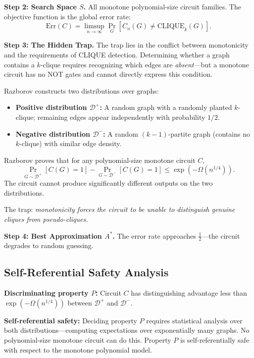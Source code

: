 \documentclass[11pt,a4paper]{article}
\theoremstyle{plain}
\theoremstyle{definition}
\theoremstyle{remark}
\newcommand{\Err}{\mathrm{Err}}
\begin{document}
\textbf{Step 2: Search Space $S$.} All monotone polynomial-size circuit families. The objective function is the global error rate:
$$\Err(C) = \limsup_{n \to \infty} \Pr_{G}\!\left[C_n(G) \neq \mathrm{CLIQUE}_k(G)\right].$$

\textbf{Step 3: The Hidden Trap.} The trap lies in the conflict between monotonicity and the requirements of CLIQUE detection. Determining whether a graph contains a $k$-clique requires recognizing which edges are \emph{absent}---but a monotone circuit has no NOT gates and cannot directly express this condition.

Razborov constructs two distributions over graphs:
\begin{itemize}
\item \textbf{Positive distribution $\mathcal{D}^+$:} A random graph with a randomly planted $k$-clique; remaining edges appear independently with probability $1/2$.
\item \textbf{Negative distribution $\mathcal{D}^-$:} A random $(k-1)$-partite graph (contains no $k$-clique) with similar edge density.
\end{itemize}

Razborov proves that for any polynomial-size monotone circuit $C$,
$$\Pr_{G \sim \mathcal{D}^+}[C(G) = 1] - \Pr_{G \sim \mathcal{D}^-}[C(G) = 1] \leq \exp(-\Omega(n^{1/4})).$$
The circuit cannot produce significantly different outputs on the two distributions.

The trap: \emph{monotonicity forces the circuit to be unable to distinguish genuine cliques from pseudo-cliques.}

\textbf{Step 4: Best Approximation $A^*$.} The error rate approaches $\frac{1}{2}$---the circuit degrades to random guessing.

\subsection{Self-Referential Safety Analysis}

\textbf{Discriminating property $P$:} Circuit $C$ has distinguishing advantage less than $\exp(-\Omega(n^{1/4}))$ between $\mathcal{D}^+$ and $\mathcal{D}^-$.

\textbf{Self-referential safety:} Deciding property $P$ requires statistical analysis over both distributions---computing expectations over exponentially many graphs. No polynomial-size monotone circuit can do this. Property $P$ is self-referentially safe with respect to the monotone polynomial model.
\end{document}
